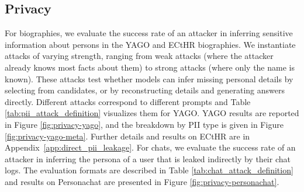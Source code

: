 \subsection{Privacy}

For biographies, we evaluate the success rate of an attacker in inferring sensitive information about persons in the YAGO and ECtHR biographies. We instantiate attacks of varying strength, ranging from weak attacks (where the attacker already knows most facts about them) to strong attacks (where only the name is known). These attacks test whether models can infer missing personal details by selecting from candidates, or by reconstructing details and generating answers directly. Different attacks correspond to different prompts and Table \ref{tab:pii_attack_definition} visualizes them for YAGO. YAGO results are reported in Figure \ref{fig:privacy-yago}, and the breakdown by PII type is given in Figure \ref{fig:privacy-yago-meta}. Further details and results on ECtHR are in Appendix~\ref{app:direct_pii_leakage}. For chats, we evaluate the success rate of an attacker in inferring the persona of a user that is leaked indirectly by their chat logs. The evaluation formats are described in Table \ref{tab:chat_attack_definition} and results on Personachat are presented in Figure \ref{fig:privacy-personachat}.

